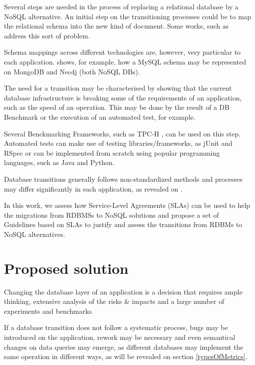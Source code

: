 Several steps are needed in the process of replacing a relational database by a NoSQL alternative. An initial step on the transitioning processes could be to map the relational schema into the new kind of document. Some works, such as \cite{lombardo2012issues} \cite{zhu2012data} address this sort of problem. 

Schema mappings across different technologies are, however, very particular to each application. \cite{bahl2014mysql} shows, for example, how a MySQL schema may be represented on MongoDB and Neo4j (both NoSQL DBs).

The need for a transition may be characterised by showing that the current database infrastructure is breaking some of the requirements of an application, such as the speed of an operation. This may be done by the result of a DB Benchmark or the execution of an automated test, for example. 

Several Benckmarking Frameworks, such as TPC-H \cite{council2008tpc}, can be used on this step. Automated tests can make use of testing libraries/frameworks, as jUnit \cite{massol2003junit} and RSpec \cite{chelimsky2010rspec} or can be implemented from scratch using popular programming languages, such as Java and Python.

Database transitions generally follows non-standardized methods and processes may differ significantly in each application, as revealed on \cite{fabioMartinSM}.

In this work, we assess how Service-Level Agreements (SLAs) can be used to help the migrations from RDBMSs to NoSQL solutions and propose a set of Guidelines based on SLAs to justify and assess the transitions from RDBMs to NoSQL alternatives.



\section{Proposed solution}

Changing the database layer of an application is a decision that requires ample thinking, extensive analysis of the risks \& impacts and a large number of experiments and benchmarks. 

If a database transition does not follow a systematic process, bugs may be introduced on the application, rework may be necessary and even semantical changes on data queries may emerge, as different databases may implement the same operation in  different ways, as will be revealed on section \ref{typesOfMetrics}.

